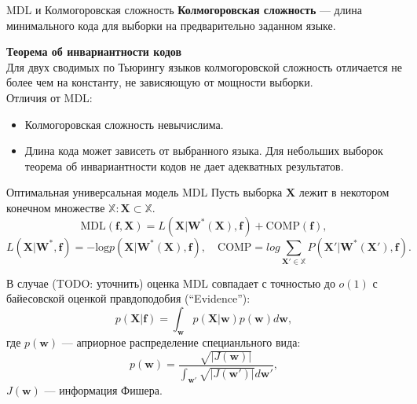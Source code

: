 \documentclass[10pt,pdf,utf8,russian,aspectratio=169]{beamer}
\begin{document}
\begin{frame}{MDL и Колмогоровская сложность}
\textbf{Колмогоровская сложность} --- длина минимального кода для выборки на предварительно заданном языке.

\textbf{Теорема об инвариантности кодов}\\
Для двух сводимых по Тьюрингу языков колмогоровской сложность  отличается не более чем на константу, не зависяющую от мощности выборки.\\

Отличия от MDL:
\begin{itemize}
\item Колмогоровская сложность невычислима.
\item Длина кода может зависеть от выбранного языка. Для небольших выборок теорема об инвариантности кодов не дает адекватных результатов.
\end{itemize}
\end{frame}

\begin{frame}{Оптимальная универсальная модель MDL}
Пусть выборка $\mathbf{X}$ лежит в некотором конечном множестве $\mathbb{X}: \mathbf{X} \subset \mathbb{X}$.
\[
\text{MDL}(\mathbf{f}, \mathbf{X}) = L(\mathbf{X}|\mathbf{W}^*(\mathbf{X}), \mathbf{f}) + \text{COMP}(\mathbf{f}),
\]
$$ L(\mathbf{X}|\mathbf{W}^*, \mathbf{f}) = -\text{log}p(\mathbf{X}|\mathbf{W}^*(\mathbf{X}), \mathbf{f}), \quad 
\text{COMP} = log \sum_{\mathbf{X}' \in \mathbb{X}} P(\mathbf{X}'|\mathbf{W}^*(\mathbf{X}'), \mathbf{f}).$$

В случае (TODO: уточнить) оценка MDL совпадает с точностью до $o(1)$ с байесовской оценкой правдоподобия (``Evidence''):
\[
	p(\mathbf{X}|\mathbf{f}) = \int_\mathbf{w} p(\mathbf{X}|\mathbf{w})p(\mathbf{w}) d\mathbf{w},
\]
где $p(\mathbf{w})$ --- априорное распределение специанльного вида:
$$
	p(\mathbf{w}) = \frac{\sqrt{|J(\mathbf{w})|}}{\int_{\mathbf{w}'} \sqrt{|J(\mathbf{w'})|}d\mathbf{w'}},
$$
$J(\mathbf{w})$  --- информация Фишера.
\end{frame}	
\end{document}
